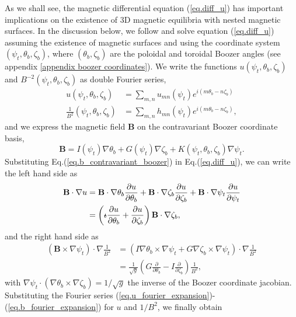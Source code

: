\documentclass[my_thesis.tex]{subfiles}
\begin{document}
As we shall see, the magnetic differential equation (\ref{eq.diff_u}) has important implications on the existence of 3D magnetic equilibria with nested magnetic surfaces. In the discussion below, we follow \citet{helanderTheoryPlasmaConfinement2014} and solve equation (\ref{eq.diff_u}) assuming the existence of magnetic surfaces and using the coordinate system $(\psi_t,\theta_b,\zeta_b)$, where $(\theta_b,\zeta_b)$ are the poloidal and toroidal Boozer angles (see appendix \ref{appendix boozer coordinates}). We write the functions $u(\psi_t,\theta_b,\zeta_b)$ and $B^{-2}(\psi_t,\theta_b,\zeta_b)$ as double Fourier series,
\begin{align}
	u(\psi_t,\theta_b,\zeta_b) &= \sum_{m,n} u_{mn}(\psi_t) e^{i(m\theta_b-n\zeta_b)}\label{eq.u_fourier_expansion}\\
	\frac{1}{B^2}(\psi_t,\theta_b,\zeta_b) &= \sum_{m,n} h_{mn}(\psi_t) e^{i(m\theta_b-n\zeta_b)}\label{eq.b_fourier_expansion},
\end{align}
and we express the magnetic field $\mathbf{B}$ on the contravariant Boozer coordinate basis,
\begin{equation}
	\mathbf{B} = I(\psi_t)\nabla\theta_b + G(\psi_t)\nabla\zeta_b + K(\psi_t,\theta_b,\zeta_b)\nabla\psi_t.\label{eq.b_contravariant_boozer}
\end{equation}
Substituting Eq.(\ref{eq.b_contravariant_boozer}) in Eq.(\ref{eq.diff_u}), we can write the left hand side as
\begin{align}
	\mathbf{B}\cdot\nabla u &= \mathbf{B}\cdot\nabla\theta_b\frac{\partial u}{\partial \theta_b} + \mathbf{B}\cdot\nabla\zeta_b\frac{\partial u}{\partial \zeta_b} + \mathbf{B}\cdot\nabla\psi_t\frac{\partial u}{\partial \psi_t} \\
	&= \left(\text{$\iota\!\!$-} \frac{\partial u}{\partial \theta_b} + \frac{\partial u}{\partial \zeta_b}\right)\mathbf{B}\cdot\nabla\zeta_b,
\end{align}
and the right hand side as
\begin{align}
	\left(\mathbf{B}\times\nabla\psi_t\right)\cdot\nabla \frac{1}{B^2} &= \left(I\nabla\theta_b\times\nabla\psi_t + G\nabla\zeta_b\times\nabla\psi_t\right)\cdot\nabla\frac{1}{B^2}\\
	&= \frac{1}{\sqrt{g}}\left(G\frac{\partial}{\partial\theta_b} - I \frac{\partial}{\partial \zeta_b}\right)\frac{1}{B^2},
\end{align}
with $\nabla\psi_t\cdot(\nabla\theta_b\times\nabla\zeta_b) = 1/\sqrt{g}$ the inverse of the Boozer coordinate jacobian. Substituting the Fourier series (\ref{eq.u_fourier_expansion})-(\ref{eq.b_fourier_expansion}) for $u$ and $1/B^2$, we finally obtain
\end{document}
